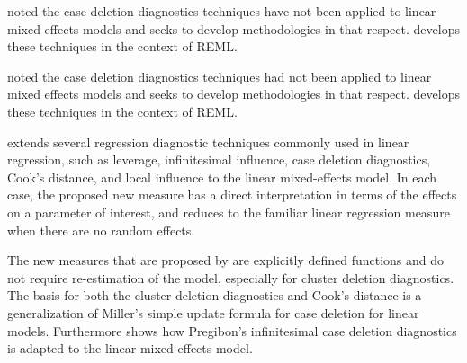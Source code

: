 \documentclass[12pt, a4paper]{report}
\theoremstyle{plain}
\theoremstyle{definition}
\theoremstyle{remark}
\begin{document}
\citet{Christiansen} noted the case deletion diagnostics techniques have not been applied to linear mixed effects models and seeks to develop methodologies in that respect. \citet{Christiansen} develops these techniques in the context of REML.

\citet{CPJ} noted the case deletion diagnostics techniques had not been applied to linear mixed effects models and seeks to develop methodologies in that respect. \citet{CPJ} develops these techniques in the context of REML.




\citet{Demi} extends several regression diagnostic techniques commonly used in linear regression, such as leverage, infinitesimal influence, case deletion diagnostics, Cook's distance, and local influence to the linear mixed-effects model. In each case, the proposed new measure has a direct interpretation in terms of the effects on a parameter of interest, and reduces to the familiar linear regression measure when there are no random effects. 

The new measures that are proposed by \citet{Demi} are explicitly defined functions and do not require re-estimation of the model, especially for cluster deletion diagnostics. The basis for both the cluster deletion diagnostics and Cook's distance is a generalization of Miller's simple update formula for case deletion for linear models. Furthermore \citet{Demi} shows how Pregibon's infinitesimal case deletion diagnostics is adapted to the linear mixed-effects model. 


%
%
%
\end{document}
